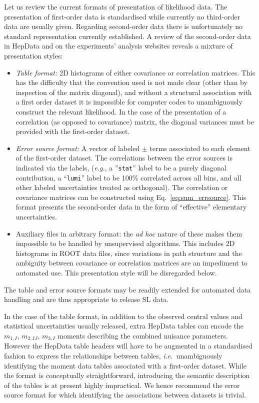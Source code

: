 \documentclass[11pt]{article}
\def\ie{{\it i.e.}}
\def\eg{{\it e.g.}}
\begin{document}
Let us review the current formats of presentation of likelihood data. The presentation
of first-order data is standardised while currently no third-order data are usually given.
Regarding second-order data there is unfortunately no standard representation
currently established.  A review of the second-order data in HepData 
and on the experiments' analysis websites reveals a
mixture of presentation styles:
%
\begin{itemize}
\item \textit{Table format:} 2D histograms of either covariance or correlation
  matrices. This has the difficulty that the convention used is not made clear
  (other than by inspection of the matrix diagonal), and without a structural
  association with a first order dataset it is impossible for computer codes to
  unambiguously construct the relevant likelihood. In the case of the
  presentation of a correlation (as opposed to covariance) matrix, the diagonal
  variances must be provided with the first-order dataset.

\item \textit{Error source format:} A vector of labeled $\pm$ terms associated
  to each element of the first-order dataset. The correlations between the error
  sources is indicated via the labels, (\eg, a ''\texttt{stat}'' label to be a
  purely diagonal contribution, a ``\texttt{lumi}'' label to be 100\% correlated
  across all bins, and all other labeled uncertainties treated as orthogonal).
  The correlation or covariance matrices can be constructed using Eq.~\eqref{eq:sum_errsource}.
  This format presents the second-order data in the form of ``effective''
  elementary uncertainties.

\item Auxiliary files in arbitrary format: the \emph{ad hoc} nature of these
  makes them impossible to be handled by unsupervised algorithms. This includes
  2D histograms in ROOT data files, since variations in path structure and the
  ambiguity between covariance or correlation matrices are an impediment to
  automated use. This presentation style will be disregarded below.
\end{itemize}
%
The table and error source formats  may be readily extended for automated data
handling and are thus appropriate to release SL data.

In the case of the table format, in addition to the observed central values and
statistical uncertainties usually released, extra HepData tables can encode the
$m_{1,I}$, $m_{2,IJ}$, $m_{3,I}$ moments describing the combined nuisance
parameters.  However the HepData table headers will have to be augmented in a
standardised fashion to express the relationships between tables,
\ie\ unambiguously identifying the moment data tables associated with a
first-order dataset. While the format is conceptually straightforward,
introducing the semantic description of the tables is at present highly
impractical. We hence recommend the error source format for which identifying
the associations between datasets is trivial.
\end{document}

